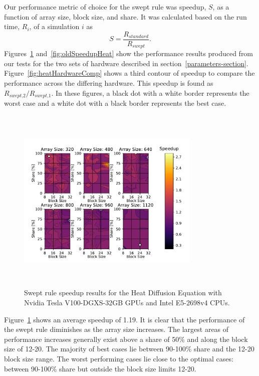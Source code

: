 \documentclass[preprints,article,accept,moreauthors,pdftex]{Definitions/mdpi}
\def\newCPU{Intel E5-2698v4} %
\def\newGPU{Nvidia Tesla V100-DGXS-32GB}
\begin{document}
Our performance metric of choice for the swept rule was speedup, $S$, as a function of array size, block size, and share. It was calculated based on the run time, $R_i$, of a simulation $i$ as
\begin{equation}
    S = \frac{R_{\textit{standard}}}{R_{\textit{swept}}}.
\end{equation}
Figures~\ref{fig:newSpeedupHeat} and~\ref{fig:oldSpeedupHeat} show the performance results produced from our tests for the two sets of hardware described in section~\ref{parameters-section}. 
Figure~\ref{fig:heatHardwareComp} shows a third contour of speedup to compare the performance across the differing hardware. This speedup is found as $R_{\textit{swept,2}}/R_{\textit{swept,1}}$. In these figures, a black dot with a white border represents the worst case and a white dot with a black border represents the best case.

\begin{figure}[H]
    
    \begin{center}
        \includegraphics[height=9cm,width=0.78\textwidth, trim={0.75cm 0.4cm 0.8cm 0.7cm},clip]{figs/speedUpheatNew.pdf}
        \caption{Swept rule speedup results for the Heat Diffusion Equation with \newGPU{} GPUs and \newCPU{} CPUs.}
        \label{fig:newSpeedupHeat}
    \end{center}
\end{figure}




Figure~\ref{fig:newSpeedupHeat} shows an average speedup of 1.19. It is clear that the performance of the swept rule diminishes as the array size increases. The largest areas of performance increases generally exist above a share of 50\% and along the block size of 12-20. The majority of best cases lie between 90-100\% share and the 12-20 block size range. The worst performing cases lie close to the optimal cases: between 90-100\% share but outside the block size limits 12-20.
\end{document}
